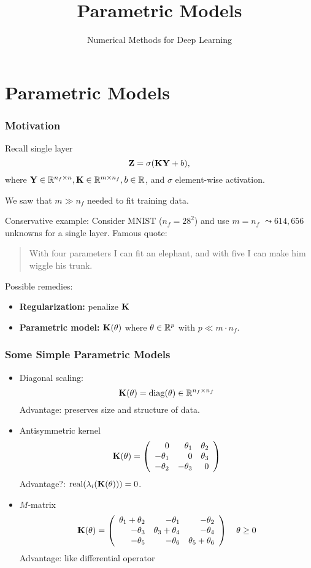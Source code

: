 \documentclass[12pt,fleqn,handout]{beamer}
\title{Parametric Models}
\subtitle{Numerical Methods for Deep Learning}
\date{}
\begin{document}
\makebeamertitle

\section{Parametric Models} %
\label{sec:parametric_models}
\begin{frame}[fragile]\frametitle{Motivation}

Recall single layer
$$
	{\bf Z} = \sigma({\bf K}{\bf Y} + b),
$$
where ${\bf Y} \in \mathbb{R}^{n_f\times n}, {\bf K} \in \mathbb{R}^{m \times n_f}, b\in\mathbb{R}$, and $\sigma$ element-wise activation. 

\bigskip
\pause

We saw that $m \gg n_f$ needed to fit training data. 

Conservative example: Consider MNIST ($n_f = 28^2$) and use $m=n_f$ $\leadsto 614,656$ unknowns for a single layer. \pause Famous quote:

\begin{quote}
	With four parameters I can fit an elephant, and with five I can make him wiggle his trunk.
\end{quote}

\bigskip
\pause

Possible remedies:
\begin{itemize}
	\item \textbf{Regularization:} penalize ${\bf K}$ 
	\item \textbf{Parametric model:} ${\bf K}(\theta)$ where $\theta\in\mathbb{R}^p$ with $p\ll m\cdot n_f$.
\end{itemize}
\end{frame}

\begin{frame}\frametitle{Some Simple Parametric Models}
	
	\begin{itemize}
		\item Diagonal scaling:
		$$
			{\bf K}(\theta) = {\rm diag}(\theta) \in \mathbb{R}^{n_f\times n_f}
		$$
		Advantage: preserves size and structure of data.
		\pause
		\item Antisymmetric kernel
		$$
			{\bf K}(\theta) = \left(
				\begin{array}{rrr}
					0 & \theta_1 & \theta_2 \\
					-\theta_1 & 0 & \theta_3 \\
					-\theta_2 & -\theta_3 & 0
				\end{array}
			\right)
		$$
		Advantage?: ${\rm real}(\lambda_i({\bf K}(\theta))) = 0$. 
		\pause
		\item $M$-matrix
		$$
		{\bf K}(\theta) = \left(
				\begin{array}{rrr}
					\theta_1+\theta_2 & -\theta_1 & -\theta_2 \\
					-\theta_3 & \theta_3 + \theta_4 & -\theta_4 \\
					-\theta_5 & -\theta_6 & \theta_5+\theta_6
				\end{array}
			\right)
			\quad \theta \geq 0
		$$
		Advantage: like differential operator
	\end{itemize}
\end{frame}
\end{document}
